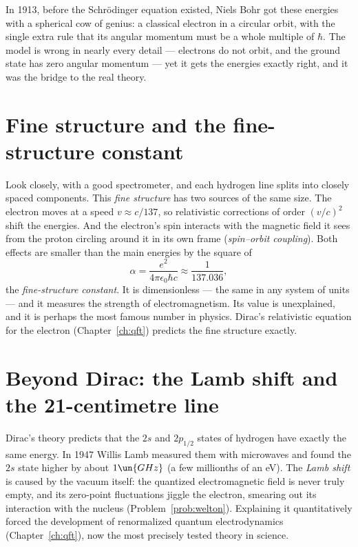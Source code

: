 In 1913, before the Schr\"odinger equation existed, Niels Bohr got these energies with a spherical cow of genius: a classical electron in a circular orbit, with the single extra rule that its angular momentum must be a whole multiple of $\hbar$. The model is wrong in nearly every detail --- electrons do not orbit, and the ground state has zero angular momentum --- yet it gets the energies exactly right, and it was the bridge to the real theory.

\section{Fine structure and the fine-structure constant}

Look closely, with a good spectrometer, and each hydrogen line splits into closely spaced components. This \emph{fine structure} has two sources of the same size. The electron moves at a speed $v\approx c/137$, so relativistic corrections of order $(v/c)^2$ shift the energies. And the electron's spin interacts with the magnetic field it sees from the proton circling around it in its own frame (\emph{spin--orbit coupling}). Both effects are smaller than the main energies by the square of
\[
  \alpha = \frac{e^2}{4\pi\epsilon_0\hbar c}\approx\frac{1}{137.036},
\]
the \emph{fine-structure constant}. It is dimensionless --- the same in any system of units --- and it measures the strength of electromagnetism. Its value is unexplained, and it is perhaps the most famous number in physics. Dirac's relativistic equation for the electron (Chapter~\ref{ch:qft}) predicts the fine structure exactly.

\section{Beyond Dirac: the Lamb shift and the 21-centimetre line}

Dirac's theory predicts that the $2s$ and $2p_{1/2}$ states of hydrogen have exactly the same energy. In 1947 Willis Lamb measured them with microwaves and found the $2s$ state higher by about $1\un{GHz}$ (a few millionths of an eV). The \emph{Lamb shift} is caused by the vacuum itself: the quantized electromagnetic field is never truly empty, and its zero-point fluctuations jiggle the electron, smearing out its interaction with the nucleus (Problem~\ref{prob:welton}). Explaining it quantitatively forced the development of renormalized quantum electrodynamics (Chapter~\ref{ch:qft}), now the most precisely tested theory in science.

